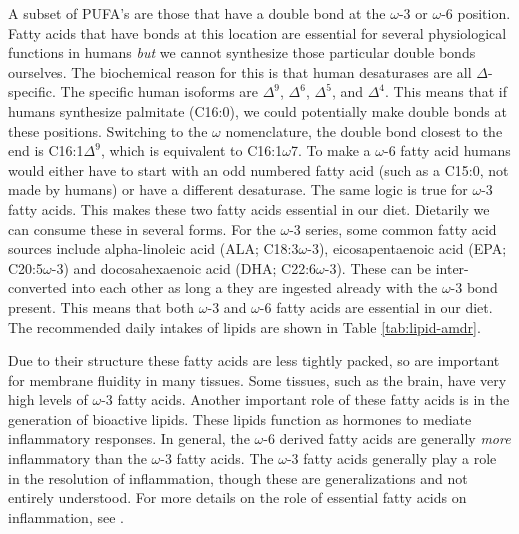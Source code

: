 \documentclass{tufte-handout}
\begin{document}
A subset of PUFA's are those that have a double bond at the $\omega$-3 or $\omega$-6 position.  Fatty acids that have bonds at this location are essential for several physiological functions in humans \emph{but} we cannot synthesize those particular double bonds ourselves.  The biochemical reason for this is that human desaturases are all $\Delta$-specific.  The specific human isoforms are $\Delta^9$, $\Delta^6$, $\Delta^5$, and $\Delta^4$.  This means that if humans synthesize palmitate (C16:0), we could potentially make double bonds at these positions.  Switching to the $\omega$ nomenclature, the double bond closest to the end is C16:1$\Delta^9$, which is equivalent to C16:1$\omega$7.  To make a $\omega$-6 fatty acid humans would either have to start with an odd numbered fatty acid (such as a C15:0, not made by humans) or have a different desaturase.  The same logic is true for $\omega$-3 fatty acids.  This makes these two fatty acids essential in our diet.  Dietarily we can consume these in several forms.  For the $\omega$-3 series, some common fatty acid sources include alpha-linoleic acid (ALA; C18:3$\omega$-3), eicosapentaenoic acid (EPA; C20:5$\omega$-3) and docosahexaenoic acid (DHA; C22:6$\omega$-3).  These can be inter-converted into each other as long a they are ingested already with the $\omega$-3 bond present.  This means that both $\omega$-3  and $\omega$-6 fatty acids are essential in our diet.  The recommended daily intakes of lipids are shown in Table \ref{tab:lipid-amdr}.

  Due to their structure these fatty acids are less tightly packed, so are important for membrane fluidity in many tissues.  Some tissues, such as the brain, have very high levels of $\omega$-3 fatty acids.  Another important role of these fatty acids is in the generation of bioactive lipids.  These lipids function as hormones to mediate inflammatory responses.  In general, the $\omega$-6 derived fatty acids are generally \emph{more} inflammatory than the $\omega$-3 fatty acids.  The $\omega$-3 fatty acids generally play a role in the resolution of inflammation, though these are generalizations and not entirely understood.  For more details on the role of essential fatty acids on inflammation, see \citet{Calder2013}.  
\end{document}
